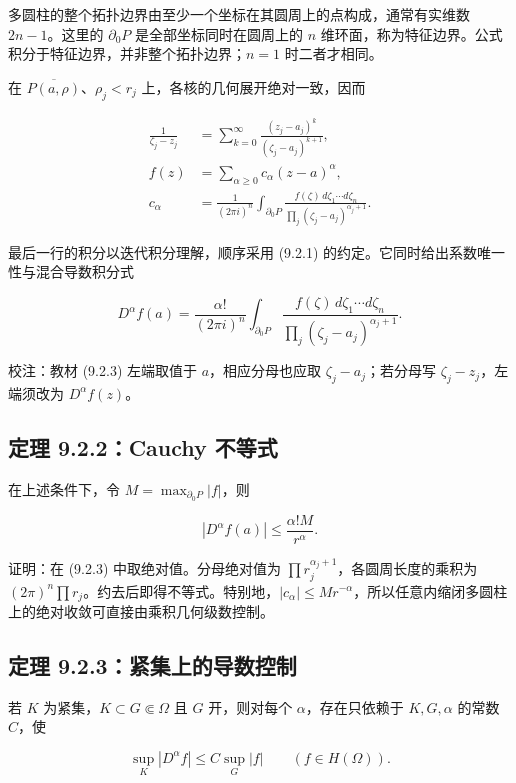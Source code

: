 \documentclass[11pt,a4paper]{article}
\begin{document}
多圆柱的整个拓扑边界由至少一个坐标在其圆周上的点构成，通常有实维数
\(2n-1\)。这里的 \(\partial_0P\) 是全部坐标同时在圆周上的 \(n\)
维环面，称为特征边界。公式积分于特征边界，并非整个拓扑边界；\(n=1\)
时二者才相同。

在 \(\overline{P(a,\rho)}\)、\(\rho_j<r_j\)
上，各核的几何展开绝对一致，因而

\[
\begin{aligned}
\frac1{\zeta_j-z_j}
&=\sum_{k=0}^\infty\frac{(z_j-a_j)^k}{(\zeta_j-a_j)^{k+1}},\\
f(z)&=\sum_{\alpha\ge0}c_\alpha(z-a)^\alpha,\\
c_\alpha&=\frac1{(2\pi i)^n}\int_{\partial_0P}
\frac{f(\zeta)\,d\zeta_1\cdots d\zeta_n}
{\prod_j(\zeta_j-a_j)^{\alpha_j+1}}.
\end{aligned}
\]

最后一行的积分以迭代积分理解，顺序采用 (9.2.1)
的约定。它同时给出系数唯一性与混合导数积分式

\[
D^\alpha f(a)=\frac{\alpha!}{(2\pi i)^n}\int_{\partial_0P}
\frac{f(\zeta)\,d\zeta_1\cdots d\zeta_n}
{\prod_j(\zeta_j-a_j)^{\alpha_j+1}}.
\tag{9.2.3}
\]

校注：教材 (9.2.3) 左端取值于 \(a\)，相应分母也应取
\(\zeta_j-a_j\)；若分母写 \(\zeta_j-z_j\)，左端须改为
\(D^\alpha f(z)\)。

\subsection{定理 9.2.2：Cauchy 不等式}\label{ch09-s2-heading-3}

在上述条件下，令 \(M=\max_{\partial_0P}|f|\)，则

\[
|D^\alpha f(a)|\le\frac{\alpha!M}{r^\alpha}.
\]

证明：在 (9.2.3) 中取绝对值。分母绝对值为
\(\prod r_j^{\alpha_j+1}\)，各圆周长度的乘积为
\((2\pi)^n\prod r_j\)。约去后即得不等式。特别地，\(|c_\alpha|\le Mr^{-\alpha}\)，所以任意内缩闭多圆柱上的绝对收敛可直接由乘积几何级数控制。

\subsection{定理 9.2.3：紧集上的导数控制}\label{ch09-s2-heading-4}

若 \(K\) 为紧集，\(K\subset G\Subset\Omega\) 且 \(G\) 开，则对每个
\(\alpha\)，存在只依赖于 \(K,G,\alpha\) 的常数 \(C\)，使

\[
\sup_K|D^\alpha f|\le C\sup_G|f|\qquad(f\in H(\Omega)).
\]
\end{document}
